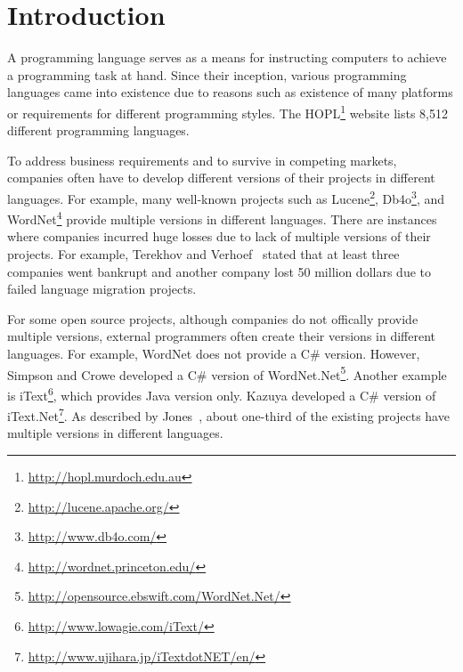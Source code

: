 \section{Introduction}
\label{sec:introduction} 

A programming language serves as a means for instructing computers to achieve a programming task at hand.
Since their inception, various programming languages came into existence due to  
reasons such as existence of many platforms or requirements for different programming styles.
The HOPL\footnote{\url{http://hopl.murdoch.edu.au}} website lists 
8,512 different programming languages. 

To address business requirements and to survive in competing markets, companies
often have to develop different versions of their projects in different languages.
For example, many well-known projects such as Lucene\footnote{\url{http://lucene.apache.org/}},
Db4o\footnote{\url{http://www.db4o.com/}}, and WordNet\footnote{\url{http://wordnet.princeton.edu/}} provide
multiple versions in different languages. There are instances where
companies incurred huge losses due to lack of multiple versions of their projects.
For example, Terekhov and Verhoef~\cite{terekhov2000realities} stated that at least three
companies went bankrupt and another company lost 50 million dollars due to failed language migration projects.

For some open source projects, although companies do not offically provide multiple versions, external programmers often
create their versions in different languages. For example, WordNet does not
provide a C\# version. However, Simpson and Crowe developed
a C\# version of WordNet.Net\footnote{\url{http://opensource.ebswift.com/WordNet.Net/}}. 
Another example is iText\footnote{\url{http://www.lowagie.com/iText/}}, which
provides Java version only. Kazuya developed a C\# version of 
iText.Net\footnote{\url{http://www.ujihara.jp/iTextdotNET/en/}}. As described by Jones~\cite{jones1998estimating}, 
about one-third of the existing projects have multiple versions in different languages.

